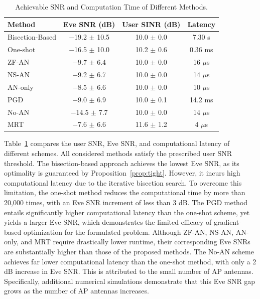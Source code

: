 \documentclass[journal]{IEEEtran}
\begin{document}
\begin{table}[!t]
\centering
\caption{Achievable SNR and Computation Time of Different Methods.}
\label{tab:results}
\setlength{\tabcolsep}{3pt}
\begin{tabular}{@{}lccc@{}}
\toprule
Method & Eve SNR (dB) & User SINR (dB) & Latency \\
\midrule
Bisection-Based & $-$19.2 $\pm$ 10.5 & 10.0 $\pm$ 0.0 & 7.30 s \\
One-shot & $-$16.5 $\pm$ 10.0 & 10.2 $\pm$ 0.6 & 0.36 ms \\
\midrule
ZF-AN & $-$9.7 $\pm$ 6.4 & 10.0 $\pm$ 0.0 & 16 $\mu$s \\
NS-AN & $-$9.2 $\pm$ 6.7 & 10.0 $\pm$ 0.0 & 14 $\mu$s \\
AN-only & $-$8.5 $\pm$ 6.6 & 10.0 $\pm$ 0.0 & 10 $\mu$s \\
PGD & $-$9.0 $\pm$ 6.9 & 10.0 $\pm$ 0.1 & 14.2 ms \\
No-AN & $-$14.5 $\pm$ 7.7 & 10.0 $\pm$ 0.0 & 14 $\mu$s \\
MRT & $-$7.6 $\pm$ 6.6 & 11.6 $\pm$ 1.2 & 4 $\mu$s \\
\bottomrule
\end{tabular}
\end{table}

Table~\ref{tab:results} compares the user SNR, Eve SNR, and computational latency of different schemes. All considered methods satisfy the prescribed user SNR threshold. The bisection-based approach achieves the lowest Eve SNR, as its optimality is guaranteed by Proposition~\ref{prop:tight}. However, it incurs high computational latency due to the iterative bisection search. To overcome this limitation, the one-shot method reduces the computational time by more than 20,000 times, with an Eve SNR increment of less than 3 dB. The PGD method entails significantly higher computational latency than the one-shot scheme, yet yields a larger Eve SNR, which demonstrates the limited efficacy of gradient-based optimization for the formulated problem. Although ZF-AN, NS-AN, AN-only, and MRT require drastically lower runtime, their corresponding Eve SNRs are substantially higher than those of the proposed methods. The No-AN scheme achieves far lower computational latency than the one-shot method, with only a 2 dB increase in Eve SNR. This is attributed to the small number of AP antennas. Specifically, additional numerical simulations demonstrate that this Eve SNR gap grows as the number of AP antennas increases.
\end{document}
